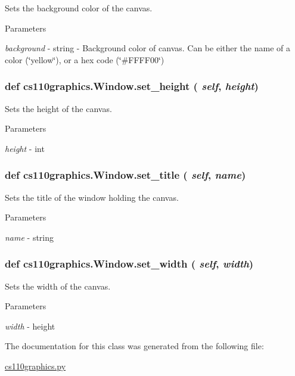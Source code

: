 Sets the background color of the canvas. 
\begin{DoxyParams}{Parameters}
\item[{\em background}]-\/ string -\/ Background color of canvas. Can be either the name of a color (\char`\"{}yellow\char`\"{}), or a hex code (\char`\"{}\#FFFF00\char`\"{}) \end{DoxyParams}
\hypertarget{classcs110graphics_1_1Window_a9b548549f8f09ca3f29e6e80483e21d2}{
\subsubsection[{set\_\-height}]{\setlength{\rightskip}{0pt plus 5cm}def cs110graphics.Window.set\_\-height ( {\em self}, \/   {\em height})}}
\label{classcs110graphics_1_1Window_a9b548549f8f09ca3f29e6e80483e21d2}


Sets the height of the canvas. 
\begin{DoxyParams}{Parameters}
\item[{\em height}]-\/ int \end{DoxyParams}
\hypertarget{classcs110graphics_1_1Window_a227c806c2acbcaca9958ba3b610a85f6}{
\subsubsection[{set\_\-title}]{\setlength{\rightskip}{0pt plus 5cm}def cs110graphics.Window.set\_\-title ( {\em self}, \/   {\em name})}}
\label{classcs110graphics_1_1Window_a227c806c2acbcaca9958ba3b610a85f6}


Sets the title of the window holding the canvas. 
\begin{DoxyParams}{Parameters}
\item[{\em name}]-\/ string \end{DoxyParams}
\hypertarget{classcs110graphics_1_1Window_a55036373bfb4437eb4368a39fedb8722}{
\subsubsection[{set\_\-width}]{\setlength{\rightskip}{0pt plus 5cm}def cs110graphics.Window.set\_\-width ( {\em self}, \/   {\em width})}}
\label{classcs110graphics_1_1Window_a55036373bfb4437eb4368a39fedb8722}


Sets the width of the canvas. 
\begin{DoxyParams}{Parameters}
\item[{\em width}]-\/ height \end{DoxyParams}


The documentation for this class was generated from the following file:\begin{DoxyCompactItemize}
\item 
\hyperlink{cs110graphics_8py}{cs110graphics.py}\end{DoxyCompactItemize}
